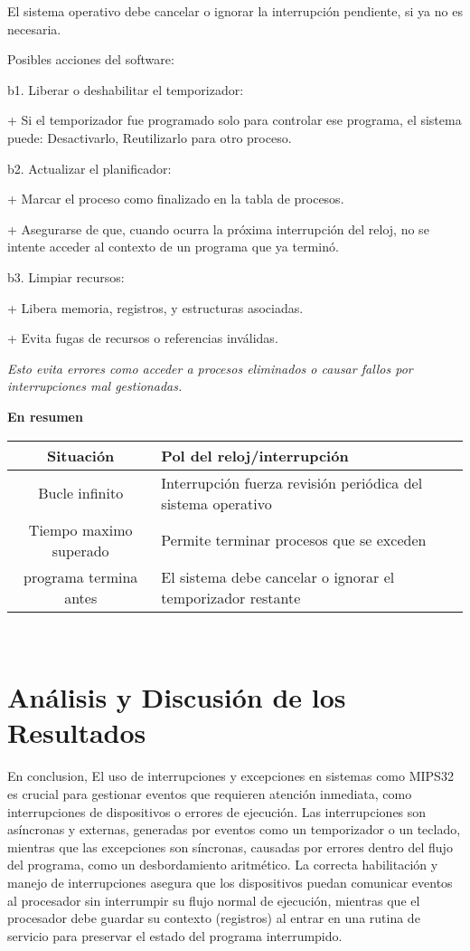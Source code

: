 \documentclass[]{article}
\begin{document}
El sistema operativo debe cancelar o ignorar la interrupción pendiente, si ya no es necesaria.

Posibles acciones del software:

b1. Liberar o deshabilitar el temporizador:

+ Si el temporizador fue programado solo para controlar ese programa, el sistema puede: Desactivarlo, Reutilizarlo para otro proceso.

b2. Actualizar el planificador:

+ Marcar el proceso como finalizado en la tabla de procesos.

+ Asegurarse de que, cuando ocurra la próxima interrupción del reloj, no se intente acceder al contexto de un programa que ya terminó.

b3. Limpiar recursos:

+ Libera memoria, registros, y estructuras asociadas.

+ Evita fugas de recursos o referencias inválidas.

\textit{Esto evita errores como acceder a procesos eliminados o causar fallos por interrupciones mal gestionadas.}

\textbf{En resumen}

\begin{tabular}{|c|p{7cm}|}
	\hline
	Situación & Pol del reloj/interrupción \\
	\hline
	Bucle infinito & Interrupción fuerza revisión periódica del sistema operativo \\
	\hline
	Tiempo maximo superado & Permite terminar procesos que se exceden \\
	\hline
	programa termina antes & El sistema debe cancelar o ignorar el temporizador restante \\
	\hline
\end{tabular}
\\

\section{Análisis y Discusión de los Resultados}

En conclusion, El uso de interrupciones y excepciones en sistemas como MIPS32 es crucial para gestionar eventos que requieren atención inmediata, como interrupciones de dispositivos o errores de ejecución. Las interrupciones son asíncronas y externas, generadas por eventos como un temporizador o un teclado, mientras que las excepciones son síncronas, causadas por errores dentro del flujo del programa, como un desbordamiento aritmético. La correcta habilitación y manejo de interrupciones asegura que los dispositivos puedan comunicar eventos al procesador sin interrumpir su flujo normal de ejecución, mientras que el procesador debe guardar su contexto (registros) al entrar en una rutina de servicio para preservar el estado del programa interrumpido.
\end{document}
